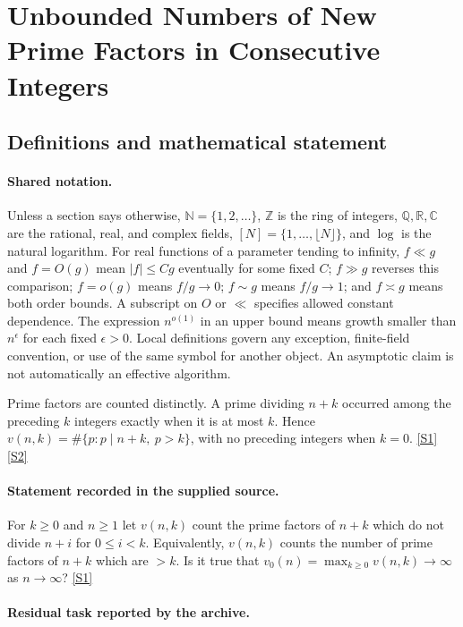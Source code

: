 \documentclass[11pt,a4paper]{article}
\newcommand{\N}{\mathbb{N}}
\newcommand{\Z}{\mathbb{Z}}
\newcommand{\Q}{\mathbb{Q}}
\newcommand{\R}{\mathbb{R}}
\newcommand{\C}{\mathbb{C}}
\newcommand{\sref}[2]{\hyperlink{source:#1:#2}{[S#2]}}
\begin{document}
\section{Unbounded Numbers of New Prime Factors in Consecutive Integers}\label{statement}


\subsection{Definitions and mathematical statement}

\paragraph{Shared notation.}Unless a section says otherwise, $\N=\{1,2,\ldots\}$,
$\Z$ is the ring of integers, $\Q,\R,\C$ are the rational, real, and complex
fields, $[N]=\{1,\ldots,\lfloor N\rfloor\}$, and $\log$ is the natural
logarithm. For real functions of a parameter tending to infinity,
$f\ll g$ and $f=O(g)$ mean $|f|\leq Cg$ eventually for some fixed $C$;
$f\gg g$ reverses this comparison; $f=o(g)$ means $f/g\to0$;
$f\sim g$ means $f/g\to1$; and $f\asymp g$ means both order bounds.
A subscript on $O$ or $\ll$ specifies allowed constant dependence.
The expression $n^{o(1)}$ in an upper bound means growth smaller than
$n^\epsilon$ for each fixed $\epsilon>0$. Local definitions govern any
exception, finite-field convention, or use of the same symbol for another
object. An asymptotic claim is not automatically an effective algorithm.



Prime factors are counted distinctly. A prime dividing $n+k$ occurred among the preceding $k$ integers exactly when it is at most $k$. Hence $v(n,k)=\#\{p:p\mid n+k,\ p>k\}$, with no preceding integers when $k=0$. \sref{statement}{1} \sref{statement}{2}

\paragraph{Statement recorded in the supplied source.}
For $k\geq 0$ and $n\geq 1$ let $v(n,k)$ count the prime factors of $n+k$ which do not divide $n+i$ for $0\leq i<k$. Equivalently, $v(n,k)$ counts the number of prime factors of $n+k$ which are $>k$.
Is it true that $ v_0(n)=\max_{k\geq 0}v(n,k)\to \infty $ as $n\to \infty$? \sref{statement}{1}

\paragraph{Residual task reported by the archive.}
\end{document}
